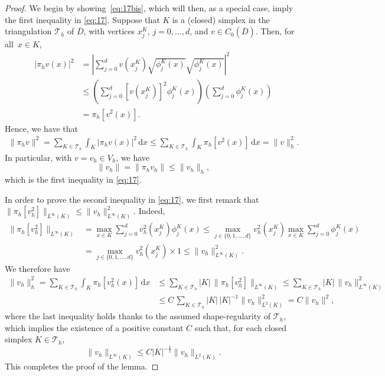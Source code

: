 \documentclass[10pt,a4paper]{amsart}
\newcommand{\dd}{\,\mathrm{d}}
\begin{document}
\begin{proof}
%
We begin by showing~\eqref{eq:17bis}, which will then, as a special case, imply the first inequality in \eqref{eq:17}.
Suppose that $K$ is a (closed) simplex in the triangulation $\mathcal{T}_h$ of $\overline{D}$, with vertices $x^K_j$, $j=0,\ldots,d$, and $v \in C_0(\overline{D})$. Then, for all~$x \in K$,
%
\begin{align*}
|\pi_hv(x)|^2 &=   \left| \sum_{j=0}^d v(x^K_j) \sqrt{\phi^K_j(x)} \sqrt{\phi^K_j(x)} \right|^2 \\
&\leq \left( \sum_{j=0}^d [v(x^K_j)]^2 \phi^K_j(x)\right) \left( \sum_{j=0}^d \phi^K_j(x)\right)  \\
&= \pi_h[v^2(x)].
\end{align*}
%
Hence, we have that 
%
\begin{align*}
\|\pi_h v\|^2   = \sum_{K \in \mathcal{T}_h}\int_K |\pi_h v(x)|^2 \dd x  \leq    \sum_{K \in \mathcal{T}_h}\int_K \pi_h [v^2(x)] \dd x =   \|v\|^2_h. 
\end{align*}
In particular, with $v= v_h \in {V}_h$, we have  
%
\[ \|v_h\|   = \|\pi_h v_h\|   \leq \|v_h\|_h, \]
%
which is the first inequality in \eqref{eq:17}. 

In order to prove the second inequality in \eqref{eq:17}, we first remark that 
$\|\pi_h [v_h^2]\|_{L^\infty(K)} \leq \|v_h\|^2_{L^\infty(K)}$. Indeed, 
%
\begin{align*}
\|\pi_h[v_h^2]\|_{L^\infty(K)} &= \max_{x \in K} \sum_{j=0}^d v_h^2(x_j^K) \phi_j^K(x)   \leq \max_{j \in \{0,1,\ldots,d\}} v_h^2(x_j^K)\max_{x \in K} \sum_{j=0}^d \phi_j^K(x)\\ &=  \max_{j \in \{0,1,\ldots,d\}} v_h^2(x_j^K) \times 1 \leq \|v_h\|^2_{L^\infty(K)}. 
\end{align*}
We therefore have 
\begin{align*}
\|v_h\|^2_h = \sum_{K \in \mathcal{T}_h} \int_K \pi_h[v_h^2(x)] \dd x & \leq \sum_{K \in \mathcal{T}_h} |K|\, \|\pi_h[v_h^2]\|_{L^\infty(K)} \leq \sum_{K \in \mathcal{T}_h} |K|\, \|v_h\|^2_{L^\infty(K)}\\
&\leq C\,\sum_{K \in \mathcal{T}_h} |K|\, |K|^{-1} \|v_h\|^2_{L^2(K)} = C\|v_h\|^2,
\end{align*}
where the last inequality holds thanks to the assumed shape-regularity of $\mathcal{T}_h$, which implies the existence of  a positive constant $C$ such that, for each closed  simplex $K \in \mathcal{T}_h$,
%
\[\|v_h\|_{L^\infty(K)} \leq C |K|^{-\frac{1}{2}}\|v_h\|_{L^2(K)}.\]
%
This completes the proof of the lemma. 
\end{proof}
\end{document}
